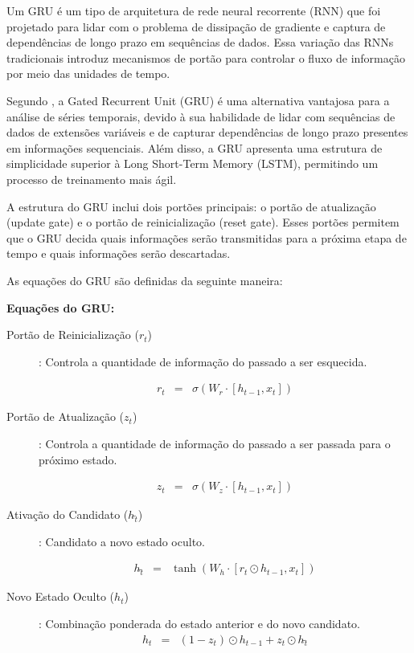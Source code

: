 Um GRU é um tipo de arquitetura de rede neural recorrente (RNN) que foi projetado para lidar com o problema de dissipação de gradiente e captura de dependências de longo prazo em sequências de dados. Essa variação das RNNs tradicionais introduz mecanismos de portão para controlar o fluxo de informação por meio das unidades de tempo.

Segundo , a Gated Recurrent Unit (GRU) é uma alternativa vantajosa para a análise de séries temporais, devido à sua habilidade de lidar com sequências de dados de extensões variáveis e de capturar dependências de longo prazo presentes em informações sequenciais. Além disso, a GRU apresenta uma estrutura de simplicidade superior à Long Short-Term Memory (LSTM), permitindo um processo de treinamento mais ágil.

A estrutura do GRU inclui dois portões principais: o portão de atualização (update gate) e o portão de reinicialização (reset gate). Esses portões permitem que o GRU decida quais informações serão transmitidas para a próxima etapa de tempo e quais informações serão descartadas.

As equações do GRU são definidas da seguinte maneira:

\textbf{Equações do GRU:}

\begin{description}
	\item[Portão de Reinicialização (\(r_t\))]: Controla a quantidade de informação do passado a ser esquecida.
	
 \begin{eqnarray}
 	r_t &=& \sigma(W_r \cdot [h_{t-1}, x_t])\label{eq:gru}
 \end{eqnarray} 

\item[Portão de Atualização (\(z_t\))]: Controla a quantidade de informação do passado a ser passada para o próximo estado.

 \begin{eqnarray}
 	z_t &=& \sigma(W_z \cdot [h_{t-1}, x_t])\label{eq:gru1}
 \end{eqnarray}

\item[Ativação do Candidato (\(h\widetilde{_t}\))]: Candidato a novo estado oculto.

\begin{eqnarray}
	h\widetilde{_t} &=& \tanh\left(W_h \cdot [r_t \odot h_{t-1}, x_t]\right)\label{eq:gru2}
\end{eqnarray}

\item[Novo Estado Oculto (\(h_t\))]: Combinação ponderada do estado anterior e do novo candidato.
\begin{eqnarray}
	h_t &=& (1 - z_t) \odot h_{t-1} + z_t \odot h\widetilde{_t}\label{eq:gru3}
\end{eqnarray}
\end{description}

